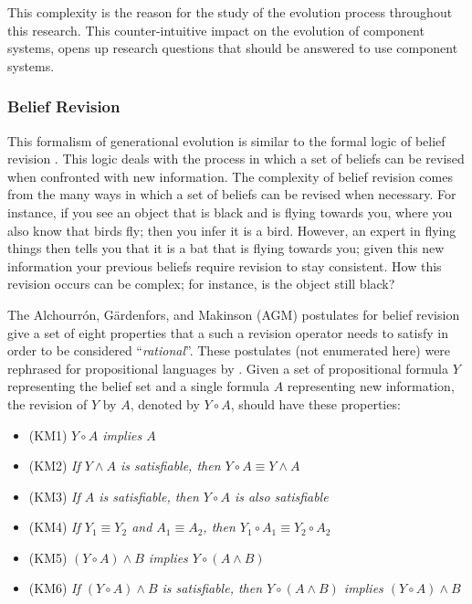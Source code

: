 This complexity is the reason for the study of the evolution process throughout this research. 
This counter-intuitive impact on the evolution of component systems, opens up research questions that should be answered to use component systems.

\subsubsection{Belief Revision}
This formalism of generational evolution is similar to the formal logic of belief revision \cite{alchourron1985logic}.
This logic deals with the process in which a set of beliefs can be revised when confronted with new information.
The complexity of belief revision comes from the many ways in which a set of beliefs can be revised when necessary.
For instance, if you see an object that is black and is flying towards you, where you also know that birds fly; then you infer it is a bird.
However, an expert in flying things then tells you that it is a bat that is flying towards you; given this new information your previous beliefs require revision to stay consistent.
How this revision occurs can be complex; for instance, is the object still black?

The Alchourrón, G\"ardenfors, and Makinson (AGM) \cite{alchourron1985logic} postulates for belief revision give a set of eight properties 
that a such a revision operator needs to satisfy in order to be considered ``\textit{rational}''.
These postulates (not enumerated here) were rephrased for propositional languages by \cite{katsuno1991propositional}. 
Given a set of propositional formula $Y$ representing the belief set and a single formula $A$ representing new information, the revision of $Y$ by $A$, denoted by $Y \circ A$,
should have these properties:

\begin{itemize}
  \item (KM1) \textit{ $Y \circ A$  implies $A$}
  \item (KM2) \textit{ If $Y \wedge A$  is satisfiable, then $Y \circ A \equiv Y \wedge A$}
  \item (KM3) \textit{ If $A$ is satisfiable, then $Y \circ A$  is also satisfiable}
  \item (KM4) \textit{ If $Y_1 \equiv Y_2$ and $A_1 \equiv A_2$, then $Y_1 \circ A_1 \equiv Y_2 \circ A_2$}
  \item (KM5) \textit{ $(Y \circ A) \wedge B$  implies $Y \circ (A \wedge B)$}
  \item (KM6) \textit{ If $(Y \circ A) \wedge B$ is satisfiable, then $Y \circ (A \wedge B)$ implies $(Y \circ A) \wedge B$}
\end{itemize} 

